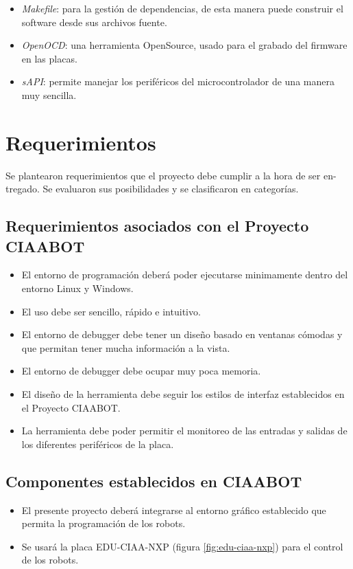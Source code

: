 \begin{itemize}
	\item \emph{Makefile}: para la gestión de dependencias, de esta manera puede construir
	el software desde sus archivos fuente.	
	\item \emph{OpenOCD}: una herramienta OpenSource, usado para el grabado del firmware
	en las placas.
	\item \emph{sAPI}\citep{sAPI}: permite manejar los periféricos del microcontrolador de una manera
	muy sencilla.
\end{itemize}


\section{Requerimientos}
\label{sec:ejemplo}

Se plantearon requerimientos que el proyecto debe cumplir a la hora de ser en-
tregado. Se evaluaron sus posibilidades y se clasificaron en categorías.

\subsection{Requerimientos asociados con el Proyecto CIAABOT}

\begin{itemize}
	\item El entorno de programación deberá poder ejecutarse minimamente dentro del entorno Linux y Windows.	
	\item El uso debe ser sencillo, rápido e intuitivo.
	\item El entorno de debugger debe tener un diseño basado en ventanas cómodas y que permitan
	tener mucha información a la vista.
	\item El entorno de debugger debe ocupar muy poca memoria.
	\item El diseño de la herramienta debe seguir los estilos de interfaz establecidos en el Proyecto CIAABOT.
	\item La herramienta debe poder permitir el monitoreo de las entradas y salidas de los diferentes periféricos de la placa.	
\end{itemize}

\subsection{Componentes establecidos en CIAABOT}

\begin{itemize}
	\item El presente proyecto deberá integrarse al entorno gráfico establecido que permita la programación de los robots.	
	\item Se usará la placa EDU-CIAA-NXP (figura \ref{fig:edu-ciaa-nxp}) para el control de los robots.	
\end{itemize}

